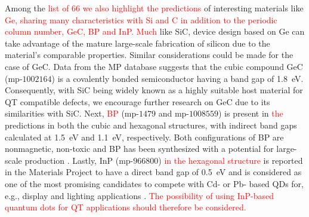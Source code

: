 \documentclass[superscriptaddress,unsortedaddress,
 amsmath,amssymb,
 aps,
]{revtex4-2}
\newcommand{\mrk}[1]{\textcolor{red}{#1}}
\begin{document}
Among the \mrk{list of $66$ we also highlight the predictions} of interesting materials like \mrk{Ge, sharing many characteristics with Si and C in addition to the periodic column number,  %
GeC, BP and InP.}  
\mrk{Much} like SiC, device design based on Ge can take advantage of the mature large-scale fabrication of silicon due to the material's comparable properties.  
Similar considerations could be made for the case of GeC. 
Data from the MP database suggests that the cubic compound GeC (mp-$1002164$) is a covalently bonded semiconductor having a band gap of \SI{1.8}{\electronvolt}. 
Consequently, with SiC being widely known as a highly suitable host material for QT compatible defects, we encourage further research on GeC due to its similarities with SiC. 
Next, \mrk{BP} (mp-$1479$ and mp-$1008559$) is present in \mrk{the} predictions in both the cubic and hexagonal structures, with indirect band gaps calculated at \SI{1.5}{\electronvolt} and \SI{1.1}{\electronvolt}, respectively. Both configurations of BP are nonmagnetic, non-toxic and BP has been synthesized with a potential for large-scale production \cite{MukhanovVladimirA2016Umso}. 
Lastly, InP (mp-$966800$) 
\mrk{in the hexagonal structure} 
is reported in the Materials Project to have a direct band gap of \SI{0.5}{\electronvolt} and is considered as one of the most promising candidates to compete with Cd- or Pb- based QDs for, e.g., display and lighting applications  \cite{Zhang2020a, Won2019}. 
\mrk{The possibility of using InP-based quantum dots for QT applications should therefore be considered.}  

\end{document}
